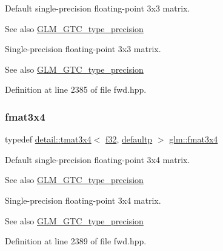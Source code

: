 Default single-\/precision floating-\/point 3x3 matrix. \begin{DoxySeeAlso}{See also}
\hyperlink{group__gtc__type__precision}{G\+L\+M\+\_\+\+G\+T\+C\+\_\+type\+\_\+precision}
\end{DoxySeeAlso}
Single-\/precision floating-\/point 3x3 matrix. \begin{DoxySeeAlso}{See also}
\hyperlink{group__gtc__type__precision}{G\+L\+M\+\_\+\+G\+T\+C\+\_\+type\+\_\+precision} 
\end{DoxySeeAlso}


Definition at line 2385 of file fwd.\+hpp.

\mbox{\label{group__gtc__type__precision_ga87084a1f4d6e8dd94f719029840dbafc}} 
\subsubsection{\texorpdfstring{fmat3x4}{fmat3x4}}
{\footnotesize\ttfamily typedef \hyperlink{structglm_1_1detail_1_1tmat3x4}{detail\+::tmat3x4}$<$ \hyperlink{group__gtc__type__precision_ga0ec999b57f5330d9021256e96038df04}{f32}, \hyperlink{namespaceglm_a0f04f086094c747d227af4425893f545a9d21ccd8b5a009ec7eb7677befc3bf51}{defaultp} $>$ \hyperlink{group__gtc__type__precision_ga87084a1f4d6e8dd94f719029840dbafc}{glm\+::fmat3x4}}

Default single-\/precision floating-\/point 3x4 matrix. \begin{DoxySeeAlso}{See also}
\hyperlink{group__gtc__type__precision}{G\+L\+M\+\_\+\+G\+T\+C\+\_\+type\+\_\+precision}
\end{DoxySeeAlso}
Single-\/precision floating-\/point 3x4 matrix. \begin{DoxySeeAlso}{See also}
\hyperlink{group__gtc__type__precision}{G\+L\+M\+\_\+\+G\+T\+C\+\_\+type\+\_\+precision} 
\end{DoxySeeAlso}


Definition at line 2389 of file fwd.\+hpp.

\mbox{\label{group__gtc__type__precision_gafbea1649c5384f13ff4595c9d0003a68}} 

